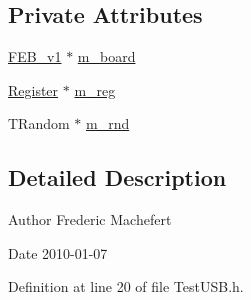 \subsection*{Private Attributes}
\begin{DoxyCompactItemize}
\item 
\hyperlink{classFEB__v1}{FEB\_\-v1} $\ast$ \hyperlink{classTestUSB_ab4a5317f74feb30410d4c1ad75ad192c}{m\_\-board}
\item 
\hyperlink{classRegister}{Register} $\ast$ \hyperlink{classTestUSB_a5f2bd3ef5db056bcfd803cb94d3a6587}{m\_\-reg}
\item 
TRandom $\ast$ \hyperlink{classTestUSB_ac3ad0c22af51e67455f919474a658dbe}{m\_\-rnd}
\end{DoxyCompactItemize}


\subsection{Detailed Description}
\begin{DoxyAuthor}{Author}
Frederic Machefert 
\end{DoxyAuthor}
\begin{DoxyDate}{Date}
2010-\/01-\/07 
\end{DoxyDate}


Definition at line 20 of file TestUSB.h.

